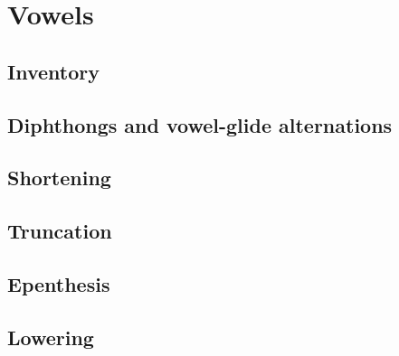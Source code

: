 \chapter{Vowels}

\section{Inventory}

\section{Diphthongs and vowel-glide alternations}

\section{Shortening}

\section{Truncation}

\section{Epenthesis}

\section{Lowering}
